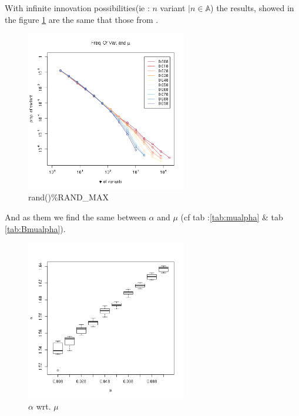 \documentclass[a4paper]{article}
\begin{document}
With infinite innovation possibilities(ie : $n$ variant $| n\in\mathbb{A} $) the results, showed in the figure \ref{fig:allMutation} are the same that those from \cite{bentley2004randomdriftandculturechange}.
\begin{figure}[hbp]
	\begin{center}
		\includegraphics[width=7cm]{img/allmuRandMax.png}
	\end{center}
	\caption{rand()\%RAND\_MAX}
	\label{fig:allMutation}
\end{figure}


And as them we find the same between $\alpha$ and $\mu$ (cf tab :\ref{tab:mualpha} \& tab \ref{tab:Bmualpha}).
\begin{figure}[hbp]
	\begin{center}
		\includegraphics[width=7cm]{img/alphawrtmu.png}
	\end{center}
	\caption{$\alpha$  wrt. $\mu$ }
	\label{fig:alphamu}
\end{figure}
\end{document}
